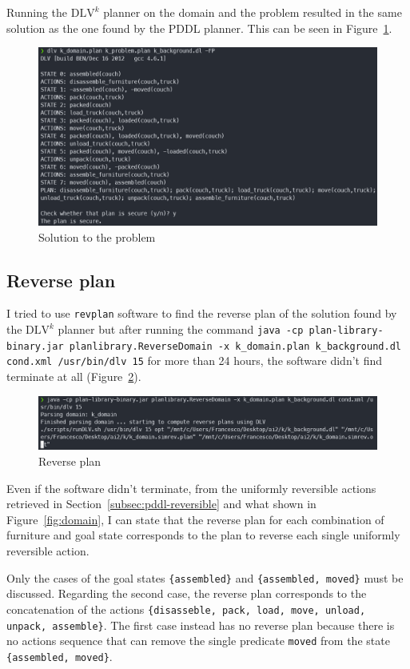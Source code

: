 \documentclass[12pt]{article}
\begin{document}
    Running the $\text{DLV}^k$ planner on the domain and the problem resulted in the same solution as the one found by the PDDL planner.
    This can be seen in Figure~\ref{fig:k-solution}.
    \begin{figure}[ht]
        \centering
        \includegraphics[width=\textwidth]{../img/k_problem_solution}
        \caption{Solution to the problem}
        \label{fig:k-solution}
    \end{figure}

    \subsection{Reverse plan}\label{subsec:k-reverse}
    I tried to use \texttt{revplan} software to find the reverse plan of the solution found by the $\text{DLV}^k$ planner but after running the command \texttt{java -cp plan-library-binary.jar planlibrary.ReverseDomain -x k_domain.plan k_background.dl cond.xml /usr/bin/dlv 15} for more than 24 hours, the software didn't find terminate at all (Figure~\ref{fig:k-reverse}).
    \begin{figure}[ht]
        \centering
        \includegraphics[width=\textwidth]{../img/k_reverse}
        \caption{Reverse plan}
        \label{fig:k-reverse}
    \end{figure}
    Even if the software didn't terminate, from the uniformly reversible actions retrieved in Section~\ref{subsec:pddl-reversible} and what shown in Figure~\ref{fig:domain}, I can state that the reverse plan for each combination of furniture and goal state corresponds to the plan to reverse each single uniformly reversible action.

    Only the cases of the goal states \texttt{\{assembled\}} and \texttt{\{assembled, moved\}} must be discussed.
    Regarding the second case, the reverse plan corresponds to the concatenation of the actions \texttt{\{disasseble, pack, load, move, unload, unpack, assemble\}}.
    The first case instead has no reverse plan because there is no actions sequence that can remove the single predicate \texttt{moved} from the state \texttt{\{assembled, moved\}}.
\end{document}
